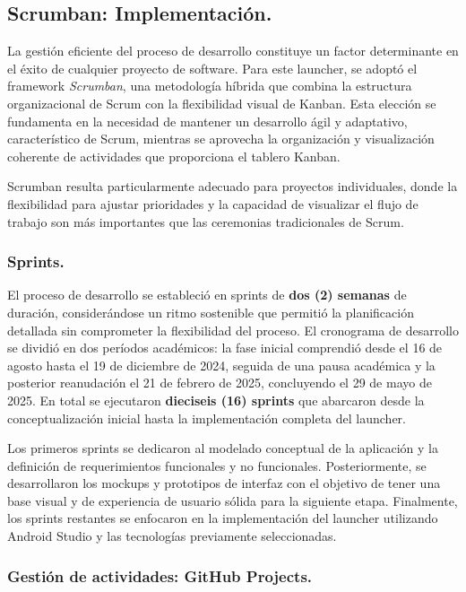 \subsection{Scrumban: Implementación.}

La gestión eficiente del proceso de desarrollo constituye un factor determinante en el éxito de cualquier proyecto de software. Para este launcher, se adoptó el framework \textit{Scrumban}, una metodología híbrida que combina la estructura organizacional de Scrum con la flexibilidad visual de Kanban. Esta elección se fundamenta en la necesidad de mantener un desarrollo ágil y adaptativo, característico de Scrum, mientras se aprovecha la organización y visualización coherente de actividades que proporciona el tablero Kanban.

Scrumban resulta particularmente adecuado para proyectos individuales, donde la flexibilidad para ajustar prioridades y la capacidad de visualizar el flujo de trabajo son más importantes que las ceremonias tradicionales de Scrum.

\subsubsection{Sprints.}

El proceso de desarrollo se estableció en sprints de \textbf{dos (2) semanas} de duración, considerándose un ritmo sostenible que permitió la planificación detallada sin comprometer la flexibilidad del proceso. El cronograma de desarrollo se dividió en dos períodos académicos: la fase inicial comprendió desde el 16 de agosto hasta el 19 de diciembre de 2024, seguida de una pausa académica y la posterior reanudación el 21 de febrero de 2025, concluyendo el 29 de mayo de 2025. En total se ejecutaron \textbf{dieciseis (16) sprints} que abarcaron desde la conceptualización inicial hasta la implementación completa del launcher.

Los primeros sprints se dedicaron al modelado conceptual de la aplicación y la definición de requerimientos funcionales y no funcionales. Posteriormente, se desarrollaron los mockups y prototipos de interfaz con el objetivo de tener una base visual y de experiencia de usuario sólida para la siguiente etapa. Finalmente, los sprints restantes se enfocaron en la implementación del launcher utilizando Android Studio y las tecnologías previamente seleccionadas.

\subsubsection{Gestión de actividades: GitHub Projects.}

